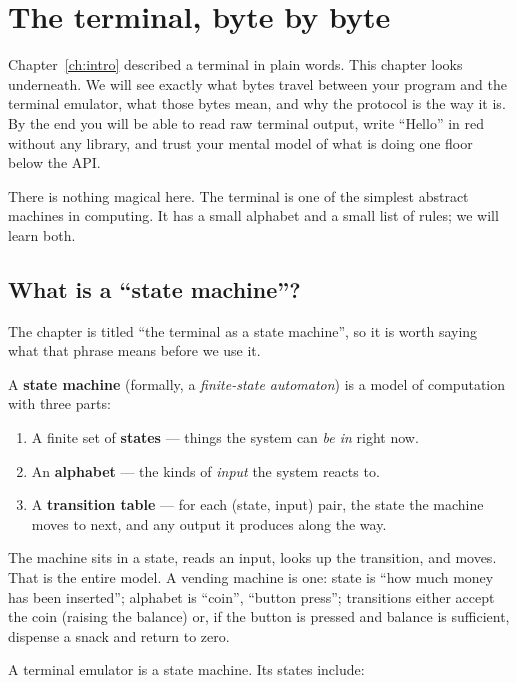 \chapter{The terminal, byte by byte}
\label{ch:terminal}

Chapter~\ref{ch:intro} described a terminal in plain words. This
chapter looks underneath. We will see exactly what bytes travel
between your program and the terminal emulator, what those bytes mean,
and why the protocol is the way it is. By the end you will be able to
read raw terminal output, write ``Hello'' in red without any library,
and trust your mental model of what \maya{} is doing one floor below
the API.

There is nothing magical here. The terminal is one of the simplest
abstract machines in computing. It has a small alphabet and a small
list of rules; we will learn both.

\section{What is a ``state machine''?}
\label{sec:term:fsm}

The chapter is titled ``the terminal as a state machine'', so it is
worth saying what that phrase means before we use it.

A \textbf{state machine} (formally, a \emph{finite-state automaton})
is a model of computation with three parts:

\begin{enumerate}[leftmargin=*]
  \item A finite set of \textbf{states} --- things the system can
    \emph{be in} right now.
  \item An \textbf{alphabet} --- the kinds of \emph{input}
    the system reacts to.
  \item A \textbf{transition table} --- for each (state, input)
    pair, the state the machine moves to next, and any output it
    produces along the way.
\end{enumerate}

The machine sits in a state, reads an input, looks up the transition,
and moves. That is the entire model. A vending machine is one: state
is ``how much money has been inserted''; alphabet is ``coin'',
``button press''; transitions either accept the coin (raising the
balance) or, if the button is pressed and balance is sufficient,
dispense a snack and return to zero.

A terminal emulator is a state machine. Its states include:

